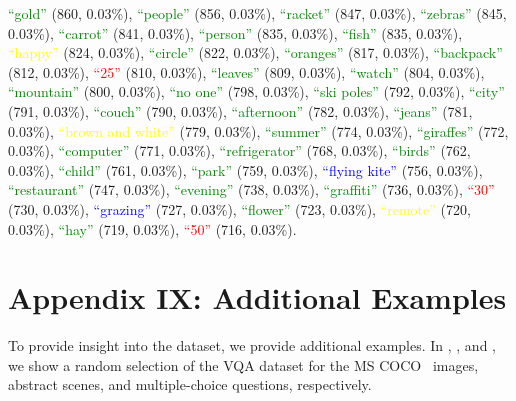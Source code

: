 {\textcolor{green}{``gold''}} (860, 0.03\%), {\textcolor{green}{``people''}} (856, 0.03\%), {\textcolor{green}{``racket''}} (847, 0.03\%), {\textcolor{green}{``zebras''}} (845, 0.03\%), {\textcolor{green}{``carrot''}} (841, 0.03\%), {\textcolor{green}{``person''}} (835, 0.03\%), {\textcolor{green}{``fish''}} (835, 0.03\%), {\textcolor{yellow}{``happy''}} (824, 0.03\%), {\textcolor{green}{``circle''}} (822, 0.03\%), {\textcolor{green}{``oranges''}} (817, 0.03\%), {\textcolor{green}{``backpack''}} (812, 0.03\%), {\textcolor{red}{``25''}} (810, 0.03\%), {\textcolor{green}{``leaves''}} (809, 0.03\%), {\textcolor{green}{``watch''}} (804, 0.03\%), {\textcolor{green}{``mountain''}} (800, 0.03\%), {\textcolor{green}{``no one''}} (798, 0.03\%), {\textcolor{green}{``ski poles''}} (792, 0.03\%), {\textcolor{green}{``city''}} (791, 0.03\%), {\textcolor{green}{``couch''}} (790, 0.03\%), {\textcolor{green}{``afternoon''}} (782, 0.03\%), {\textcolor{green}{``jeans''}} (781, 0.03\%), {\textcolor{yellow}{``brown and white''}} (779, 0.03\%), {\textcolor{green}{``summer''}} (774, 0.03\%), {\textcolor{green}{``giraffes''}} (772, 0.03\%), {\textcolor{green}{``computer''}} (771, 0.03\%), {\textcolor{green}{``refrigerator''}} (768, 0.03\%), {\textcolor{green}{``birds''}} (762, 0.03\%), {\textcolor{green}{``child''}} (761, 0.03\%), {\textcolor{green}{``park''}} (759, 0.03\%), {\textcolor{blue}{``flying kite''}} (756, 0.03\%), {\textcolor{green}{``restaurant''}} (747, 0.03\%), {\textcolor{green}{``evening''}} (738, 0.03\%), {\textcolor{green}{``graffiti''}} (736, 0.03\%), {\textcolor{red}{``30''}} (730, 0.03\%), {\textcolor{blue}{``grazing''}} (727, 0.03\%), {\textcolor{green}{``flower''}} (723, 0.03\%), {\textcolor{yellow}{``remote''}} (720, 0.03\%), {\textcolor{green}{``hay''}} (719, 0.03\%), {\textcolor{red}{``50''}} (716, 0.03\%). 


\section*{Appendix IX: Additional Examples}
\label{sec:dataset_stats}

To provide insight into the dataset, we provide additional examples. In , , and , we show a random selection of the VQA dataset for the MS COCO~\cite{coco} images, abstract scenes, and multiple-choice questions, respectively.

